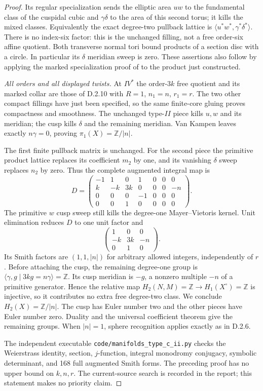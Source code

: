 \begin{proof}
Its regular specialization sends the elliptic area $uw$ to
the fundamental class of the cuspidal cubic and $\gamma\delta$
to the area of this second torus; it kills the mixed classes.
Equivalently the exact degree-two pullback lattice is
$\langle u^*w^*,\gamma^*\delta^*\rangle$.
There is no index-six factor: this is the unchanged filling,
not a free order-six affine quotient.
Both transverse normal tori bound products of a section disc
with a circle. In particular its $\delta$ meridian sweep is
zero. These assertions also follow by applying the marked
specialization proof of \cite[Proposition 3.11]{manLR26}
to the product just constructed.

\emph{All orders and all displayed twists.}
At $IV^*$ the order-$3k$ free quotient and its marked collar
are those of D.2.10 with $R=1$, $n_1=n$, $r_1=r$.
The two other compact fillings have just been specified,
so the same finite-core gluing proves compactness and
smoothness. The unchanged type-$II$ piece kills $u,w$ and
its meridian; the cusp kills $\delta$ and the remaining
meridian. Van Kampen leaves exactly $n\gamma=0$, proving
$\pi_1(X)=\mathbb Z/|n|$.

The first finite pullback matrix is unchanged. For the second
piece the primitive product lattice replaces its coefficient
$m_2$ by one, and its vanishing $\delta$ sweep replaces $n_2$
by zero. Thus the complete augmented integral map is
\[
 D=\begin{pmatrix}
 -1&1&0&1&0&0&0\\
 k&-k&3k&0&0&0&-n\\
 0&0&0&-1&0&0&0\\
 0&0&1&0&0&0&0
 \end{pmatrix}.
\]
The primitive $w$ cusp sweep still kills the degree-one
Mayer--Vietoris kernel. Unit elimination reduces $D$ to
one unit factor and
\[
 \begin{pmatrix}1&0&0\\-k&3k&-n\\0&1&0\end{pmatrix}.
\]
Its Smith factors are $(1,1,|n|)$ for arbitrary allowed
integers, independently of $r$.
Before attaching the cusp, the remaining degree-one group is
$\langle\gamma,g\mid3kg=n\gamma\rangle=\mathbb Z$.
Its cusp meridian is $-g$, a nonzero multiple $-n$ of a
primitive generator. Hence the relative map
$H_2(N,M)=\mathbb Z\to H_1(X^\circ)=\mathbb Z$ is injective,
so it contributes no extra free degree-two class.
We conclude $H_2(X)=\mathbb Z/|n|$.
The cusp has Euler number two and the other pieces have
Euler number zero. Duality and the universal coefficient
theorem give the remaining groups. When $|n|=1$, sphere
recognition applies exactly as in D.2.6.

The independent executable
\texttt{code/manifolds\_type\_c\_ii.py} checks the Weierstrass
identity, section, $j$-function, integral monodromy conjugacy,
symbolic determinant, and 168 full augmented Smith forms.
The preceding proof has no upper bound on $k,n,r$.
The current-source search is recorded in the report; this
statement makes no priority claim.
\end{proof}

